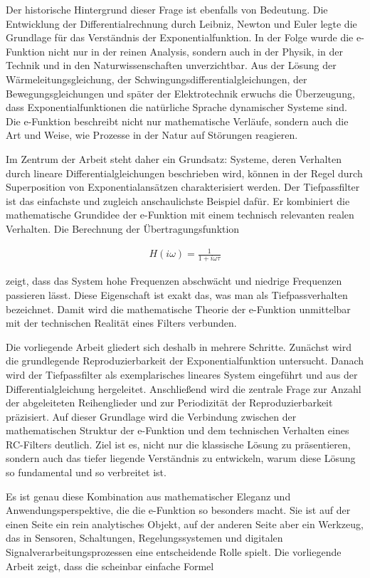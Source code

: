 \documentclass[a4paper,12pt,twoside]{report}
\theoremstyle{definition}
\begin{document}
Der historische Hintergrund dieser Frage ist ebenfalls von Bedeutung. Die Entwicklung der Differentialrechnung durch Leibniz, Newton und Euler legte die Grundlage für das Verständnis der Exponentialfunktion. In der Folge wurde die e-Funktion nicht nur in der reinen Analysis, sondern auch in der Physik, in der Technik und in den Naturwissenschaften unverzichtbar. Aus der Lösung der Wärmeleitungsgleichung, der Schwingungsdifferentialgleichungen, der Bewegungsgleichungen und später der Elektrotechnik erwuchs die Überzeugung, dass Exponentialfunktionen die natürliche Sprache dynamischer Systeme sind. Die e-Funktion beschreibt nicht nur mathematische Verläufe, sondern auch die Art und Weise, wie Prozesse in der Natur auf Störungen reagieren.

Im Zentrum der Arbeit steht daher ein Grundsatz: Systeme, deren Verhalten durch lineare Differentialgleichungen beschrieben wird, können in der Regel durch Superposition von Exponentialansätzen charakterisiert werden. Der Tiefpassfilter ist das einfachste und zugleich anschaulichste Beispiel dafür. Er kombiniert die mathematische Grundidee der e-Funktion mit einem technisch relevanten realen Verhalten. Die Berechnung der Übertragungsfunktion

\begin{align}
    H(i\omega) = \frac{1}{1+i\omega\tau}
\end{align}

zeigt, dass das System hohe Frequenzen abschwächt und niedrige Frequenzen passieren lässt. Diese Eigenschaft ist exakt das, was man als Tiefpassverhalten bezeichnet. Damit wird die mathematische Theorie der e-Funktion unmittelbar mit der technischen Realität eines Filters verbunden.

Die vorliegende Arbeit gliedert sich deshalb in mehrere Schritte. Zunächst wird die grundlegende Reproduzierbarkeit der Exponentialfunktion untersucht. Danach wird der Tiefpassfilter als exemplarisches lineares System eingeführt und aus der Differentialgleichung hergeleitet. Anschließend wird die zentrale Frage zur Anzahl der abgeleiteten Reihenglieder und zur Periodizität der Reproduzierbarkeit präzisiert. Auf dieser Grundlage wird die Verbindung zwischen der mathematischen Struktur der e-Funktion und dem technischen Verhalten eines RC-Filters deutlich. Ziel ist es, nicht nur die klassische Lösung zu präsentieren, sondern auch das tiefer liegende Verständnis zu entwickeln, warum diese Lösung so fundamental und so verbreitet ist.

Es ist genau diese Kombination aus mathematischer Eleganz und Anwendungsperspektive, die die e-Funktion so besonders macht. Sie ist auf der einen Seite ein rein analytisches Objekt, auf der anderen Seite aber ein Werkzeug, das in Sensoren, Schaltungen, Regelungssystemen und digitalen Signalverarbeitungsprozessen eine entscheidende Rolle spielt. Die vorliegende Arbeit zeigt, dass die scheinbar einfache Formel
\end{document}
